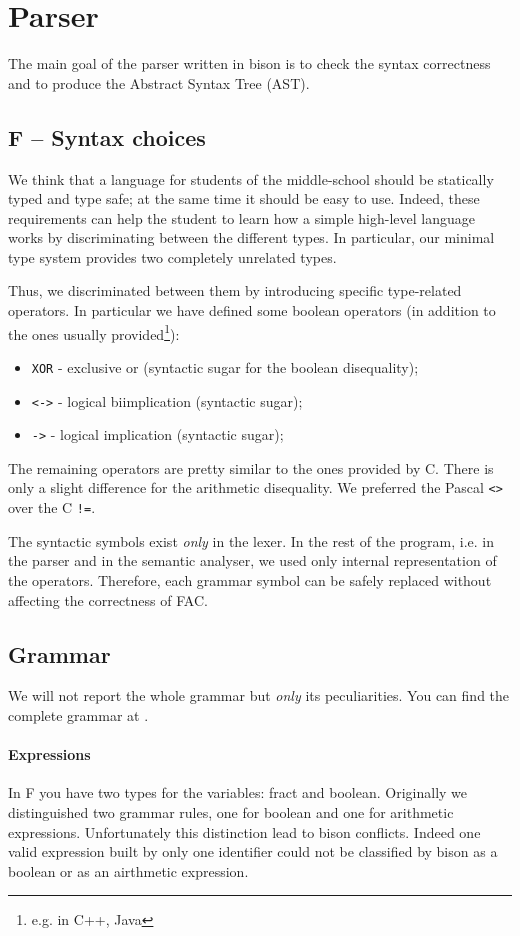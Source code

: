 \section{Parser}
\label{sec:parser}
The main goal of the parser written in bison is to check the
syntax correctness and to produce the Abstract Syntax Tree (AST).

\subsection{F -- Syntax choices}
We think that a language for students of the middle-school should be
statically typed and type safe; at the same time it should be easy to use.
Indeed, these requirements can help the student to learn how a simple
high-level language works by discriminating between the different types.
In particular, our minimal type system provides two completely unrelated types.


Thus, we discriminated between them by introducing specific type-related
operators. In particular we have defined some boolean operators
(in addition to the ones usually provided\footnote{e.g. in C++, Java}):
\begin{itemize}
	\item \verb|XOR| - exclusive or (syntactic sugar for the boolean disequality);
	\item \verb|<->| - logical biimplication (syntactic sugar);
	\item \verb|->| - logical implication (syntactic sugar);
\end{itemize}

The remaining operators are pretty similar to the ones provided by C.
There is only a slight difference for the arithmetic disequality.
We preferred the Pascal \verb|<>| over the C \verb|!=|.

The syntactic symbols exist \emph{only} in the lexer. In the
rest of the program, i.e. in the parser and in the semantic analyser, we used
only internal representation of the operators. Therefore, each grammar
symbol can be safely replaced without affecting the correctness of FAC.

\subsection{Grammar}
We will not report the whole grammar but \emph{only} its peculiarities.
You can find the complete grammar at .

\paragraph{Expressions}
In F you have two types for the variables: fract and boolean.
Originally we distinguished two grammar rules, one for boolean and
one for arithmetic expressions. Unfortunately this distinction
lead to bison conflicts.
Indeed one valid expression built by only one identifier could not be
classified by bison as a boolean or as an airthmetic expression.


